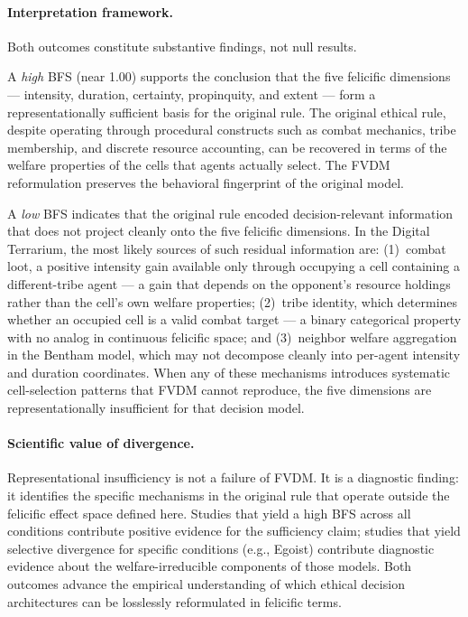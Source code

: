 \documentclass{icsthesis}
\begin{document}
\begin{mainmatter}
\paragraph{Interpretation framework.}
Both outcomes constitute substantive findings, not null results.

A \textit{high} BFS (near 1.00) supports the conclusion that the five felicific dimensions --- intensity, duration, certainty, propinquity, and extent --- form a representationally sufficient basis for the original rule. The original ethical rule, despite operating through procedural constructs such as combat mechanics, tribe membership, and discrete resource accounting, can be recovered in terms of the welfare properties of the cells that agents actually select. The FVDM reformulation preserves the behavioral fingerprint of the original model.

A \textit{low} BFS indicates that the original rule encoded decision-relevant information that does not project cleanly onto the five felicific dimensions. In the Digital Terrarium, the most likely sources of such residual information are: (1)~combat loot, a positive intensity gain available only through occupying a cell containing a different-tribe agent --- a gain that depends on the opponent's resource holdings rather than the cell's own welfare properties; (2)~tribe identity, which determines whether an occupied cell is a valid combat target --- a binary categorical property with no analog in continuous felicific space; and (3)~neighbor welfare aggregation in the Bentham model, which may not decompose cleanly into per-agent intensity and duration coordinates. When any of these mechanisms introduces systematic cell-selection patterns that FVDM cannot reproduce, the five dimensions are representationally insufficient for that decision model.

\paragraph{Scientific value of divergence.}
Representational insufficiency is not a failure of FVDM. It is a diagnostic finding: it identifies the specific mechanisms in the original rule that operate outside the felicific effect space defined here. Studies that yield a high BFS across all conditions contribute positive evidence for the sufficiency claim; studies that yield selective divergence for specific conditions (e.g., Egoist) contribute diagnostic evidence about the welfare-irreducible components of those models. Both outcomes advance the empirical understanding of which ethical decision architectures can be losslessly reformulated in felicific terms.


\end{mainmatter}
\end{document}

